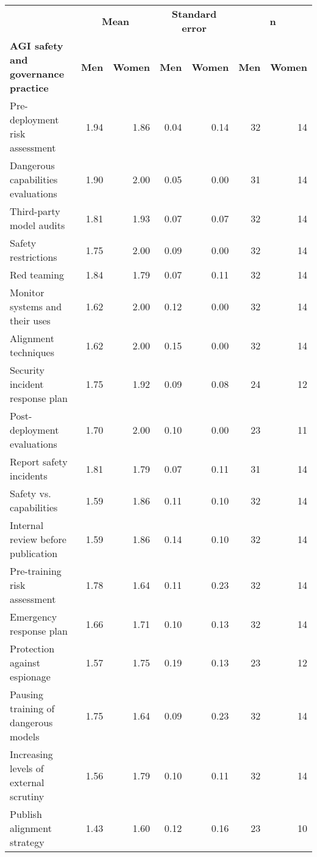 \documentclass{article}
\begin{document}
\begin{sidewaystable}
    \centering
    \fontsize{6}{8}\selectfont
    \begin{tabular}{l*{6}{r}}
        \toprule
        & \multicolumn{2}{c}{\textbf{Mean}} & \multicolumn{2}{c}{\textbf{Standard error}} & \multicolumn{2}{c}{\textbf{n}} \\
        \cmidrule(lr){2-3} \cmidrule(lr){4-5} \cmidrule(lr){6-7}
        \textbf{AGI safety and governance practice} & \textbf{Men} & \textbf{Women} & \textbf{Men} & \textbf{Women} & \textbf{Men} & \textbf{Women} \\
        \midrule
        Pre-deployment risk assessment & 1.94 & 1.86 & 0.04 & 0.14 & 32 & 14 \\
Dangerous capabilities evaluations & 1.90 & 2.00 & 0.05 & 0.00 & 31 & 14 \\
Third-party model audits & 1.81 & 1.93 & 0.07 & 0.07 & 32 & 14 \\
Safety restrictions & 1.75 & 2.00 & 0.09 & 0.00 & 32 & 14 \\
Red teaming & 1.84 & 1.79 & 0.07 & 0.11 & 32 & 14 \\
Monitor systems and their uses & 1.62 & 2.00 & 0.12 & 0.00 & 32 & 14 \\
Alignment techniques & 1.62 & 2.00 & 0.15 & 0.00 & 32 & 14 \\
Security incident response plan & 1.75 & 1.92 & 0.09 & 0.08 & 24 & 12 \\
Post-deployment evaluations & 1.70 & 2.00 & 0.10 & 0.00 & 23 & 11 \\
Report safety incidents & 1.81 & 1.79 & 0.07 & 0.11 & 31 & 14 \\
Safety vs. capabilities & 1.59 & 1.86 & 0.11 & 0.10 & 32 & 14 \\
Internal review before publication & 1.59 & 1.86 & 0.14 & 0.10 & 32 & 14 \\
Pre-training risk assessment & 1.78 & 1.64 & 0.11 & 0.23 & 32 & 14 \\
Emergency response plan & 1.66 & 1.71 & 0.10 & 0.13 & 32 & 14 \\
Protection against espionage & 1.57 & 1.75 & 0.19 & 0.13 & 23 & 12 \\
Pausing training of dangerous models & 1.75 & 1.64 & 0.09 & 0.23 & 32 & 14 \\
Increasing levels of external scrutiny & 1.56 & 1.79 & 0.10 & 0.11 & 32 & 14 \\
Publish alignment strategy & 1.43 & 1.60 & 0.12 & 0.16 & 23 & 10 \\

\end{tabular}
\end{sidewaystable}
\end{document}
